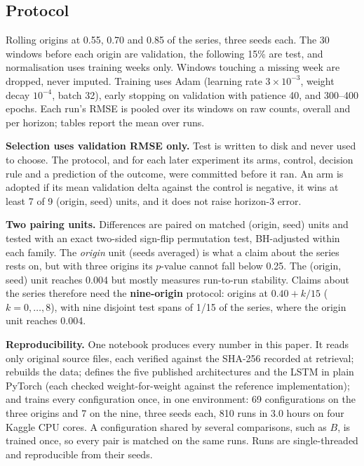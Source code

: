 \subsection{Protocol}
\label{sec:protocol}
Rolling origins at 0.55, 0.70 and 0.85 of the series, three seeds each. The 30
windows before each origin are validation, the following 15\% are test, and
normalisation uses training weeks only. Windows touching a missing week are
dropped, never imputed. Training uses Adam (learning rate $3\times10^{-3}$,
weight decay $10^{-4}$, batch 32), early stopping on validation with patience 40,
and 300--400 epochs. Each run's RMSE is pooled over its windows on raw counts,
overall and per horizon; tables report the mean over runs.

\textbf{Selection uses validation RMSE only.} Test is written to disk and
never used to choose. The protocol, and for each later experiment its arms,
control, decision rule and a prediction of the outcome, were committed before
it ran. An arm is adopted if its
mean validation delta against the control is negative, it wins at least 7 of 9
(origin, seed) units, and it does not raise horizon-3 error.

\textbf{Two pairing units.} Differences are paired on matched (origin, seed)
units and tested with an exact two-sided sign-flip permutation test, BH-adjusted
within each family. The \emph{origin} unit (seeds averaged) is what a claim about
the series rests on, but with three origins its $p$-value cannot fall below 0.25.
The (origin, seed) unit reaches 0.004 but mostly measures run-to-run stability.
Claims about the series therefore need the \textbf{nine-origin} protocol: origins
at $0.40+k/15$ ($k=0,\dots,8$), with nine disjoint test spans of 1/15 of the
series, where the origin unit reaches 0.004.

\textbf{Reproducibility.} One notebook produces every number in this paper. It
reads only original source files, each verified against the SHA-256 recorded at
retrieval; rebuilds the data; defines the five published architectures and the
LSTM in plain PyTorch (each checked weight-for-weight against the reference
implementation); and trains every configuration once, in one environment:
69 configurations on the three origins and 7 on the nine, three seeds each,
810 runs in 3.0 hours on four Kaggle CPU cores. A configuration shared by several
comparisons, such as $B$, is trained once, so every pair is matched on the same
runs. Runs are single-threaded and reproducible from their seeds.
